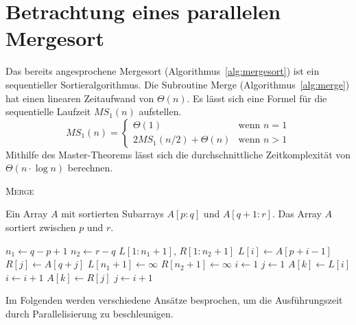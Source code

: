 \section{Betrachtung eines parallelen Mergesort}
Das bereits angesprochene Mergesort (Algorithmus~\ref{alg:mergesort}) ist ein
sequentieller Sortieralgorithmus.
Die Subroutine Merge (Algorithmus~\ref{alg:merge}) hat einen linearen
Zeitaufwand von $\Theta(n)$.
Es lässt sich eine Formel für die sequentielle Laufzeit $MS_1(n)$ aufstellen.
\begin{equation}
    MS_1(n) = \begin{cases}
        \Theta(1) & \text{wenn } n = 1 \\
        2MS_1(n/2) + \Theta(n) & \text{wenn } n > 1
    \end{cases}
\end{equation}
Mithilfe des Master-Theorems lässt sich die durchschnittliche Zeitkomplexität
von $\Theta(n \cdot \log n)$ berechnen.
%
\begin{algorithm}
    \caption{{\rmfamily \textsc{Merge}} \cite[S.31]{cormen}}
    \label{alg:merge}
    \begin{algorithmic}[1]
        \Require Ein Array $A$ mit sortierten Subarrays $A[p:q]$ und
            $A[q+1:r]$.
        \Ensure Das Array $A$ sortiert zwischen $p$ und $r$.
        \setlength\multicolsep{0pt}
        \begin{multicols}{2}
            \State $n_1 \gets q - p + 1$
            \State $n_2 \gets r - q$
            \State $L[1:n_1 +1]$, $R[1:n_2 + 1]$
                \State $L[i] \gets A[p + i - 1]$
            \EndFor
                \State $R[j] \gets A[q + j]$
            \EndFor
            \State $L[n_1 + 1] \gets \infty$
            \State $R[n_2 + 1] \gets \infty$
            \State $i \gets 1$
            \State $j \gets 1$
                    \State $A[k] \gets L[i]$
                    \State $i \gets i + 1$
                \Else
                    \State $A[k] \gets R[j]$
                    \State $j \gets i + 1$
                \EndIf
            \EndFor
        \end{multicols}
    \end{algorithmic}
\end{algorithm}

Im Folgenden werden verschiedene Ansätze besprochen, um die Ausführungszeit
durch Parallelisierung zu beschleunigen.
